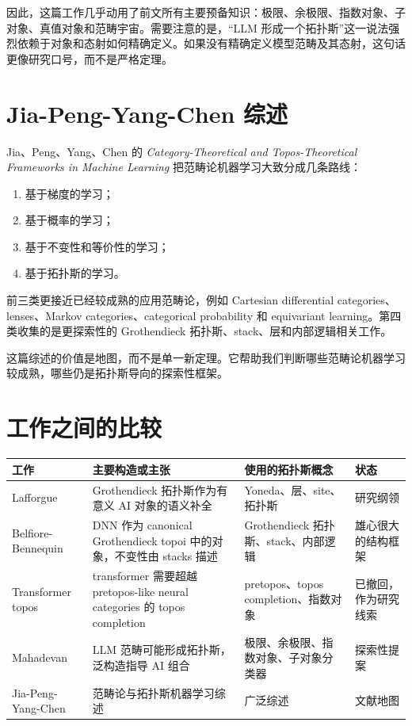 \documentclass[UTF8,11pt,fontset=none]{ctexart}
\begin{document}
因此，这篇工作几乎动用了前文所有主要预备知识：极限、余极限、指数对象、子对象、真值对象和范畴宇宙。需要注意的是，“LLM 形成一个拓扑斯”这一说法强烈依赖于对象和态射如何精确定义。如果没有精确定义模型范畴及其态射，这句话更像研究口号，而不是严格定理。


\section{Jia-Peng-Yang-Chen 综述}

Jia、Peng、Yang、Chen 的 \emph{Category-Theoretical and Topos-Theoretical Frameworks in Machine Learning} 把范畴论机器学习大致分成几条路线：


\begin{enumerate}
\item 基于梯度的学习；
\item 基于概率的学习；
\item 基于不变性和等价性的学习；
\item 基于拓扑斯的学习。
\end{enumerate}

前三类更接近已经较成熟的应用范畴论，例如 Cartesian differential categories、lenses、Markov categories、categorical probability 和 equivariant learning。第四类收集的是更探索性的 Grothendieck 拓扑斯、stack、层和内部逻辑相关工作。


这篇综述的价值是地图，而不是单一新定理。它帮助我们判断哪些范畴论机器学习较成熟，哪些仍是拓扑斯导向的探索性框架。


\section{工作之间的比较}

\begin{longtable}{>{\raggedright\arraybackslash}p{}>{\raggedright\arraybackslash}p{}>{\raggedright\arraybackslash}p{}>{\raggedright\arraybackslash}p{}}
\toprule
工作 & 主要构造或主张 & 使用的拓扑斯概念 & 状态 \\
\midrule
\endhead
Lafforgue & Grothendieck 拓扑斯作为有意义 AI 对象的语义补全 & Yoneda、层、site、拓扑斯 & 研究纲领 \\
Belfiore-Bennequin & DNN 作为 canonical Grothendieck topoi 中的对象，不变性由 stacks 描述 & Grothendieck 拓扑斯、stack、内部逻辑 & 雄心很大的结构框架 \\
Transformer topos & transformer 需要超越 pretopos-like neural categories 的 topos completion & pretopos、topos completion、指数对象 & 已撤回，作为研究线索 \\
Mahadevan & LLM 范畴可能形成拓扑斯，泛构造指导 AI 组合 & 极限、余极限、指数对象、子对象分类器 & 探索性提案 \\
Jia-Peng-Yang-Chen & 范畴论与拓扑斯机器学习综述 & 广泛综述 & 文献地图 \\
\bottomrule
\end{longtable}
\end{document}
